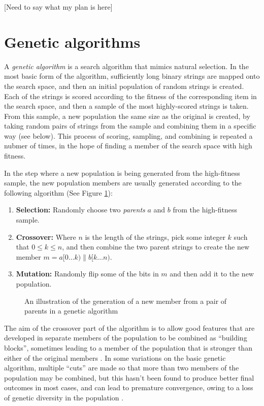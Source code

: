 \documentclass[11pt]{article}
\begin{document}
[Need to say what my plan is here]


\section{Genetic algorithms}

A \emph{genetic algorithm} is a search algorithm that mimics natural selection. In the most basic form of the algorithm, sufficiently long binary strings are mapped onto the search space, and then an initial population of random strings is created. Each of the strings is scored according to the fitness of the corresponding item in the search space, and then a sample of the most highly-scored strings is taken. From this sample, a new population the same size as the original is created, by taking random pairs of strings from the sample and combining them in a specific way (see below). This process of scoring, sampling, and combining is repeated a nubmer of times, in the hope of finding a member of the search space with high fitness.

In the step where a new population is being generated from the high-fitness sample, the new population members are usually generated according to the following algorithm (See Figure \ref{fig:genetic-algo}):

\begin{enumerate}
  \item {\bf Selection:} Randomly choose two \emph{parents} $a$ and $b$ from the high-fitness sample.
  \item {\bf Crossover:} Where $n$ is the length of the strings, pick some integer $k$ such that $0 \leq k \leq n$, and then combine the two parent strings to create the new member $m = a[0 \ldots k) \parallel b[k \ldots n)$.
  \item {\bf Mutation:} Randomly flip some of the bits in $m$ and then add it to the new population.
\end{enumerate}

\begin{figure}[h]
  
  \caption{An illustration of the generation of a new member from a pair of parents in a genetic algorithm}
  \label{fig:genetic-algo}
\end{figure}

The aim of the crossover part of the algorithm is to allow good features that are developed in separate members of the population to be combined as ``building blocks'', sometimes leading to a member of the population that is stronger than either of the original members \cite{Goldberg:1989}. In some variations on the basic genetic algorithm, multiple ``cuts'' are made so that more than two members of the population may be combined, but this hasn't been found to produce better final outcomes in most cases, and can lead to premature convergence, owing to a loss of genetic diversity in the population \cite{Esquivel:1997}.
\end{document}
